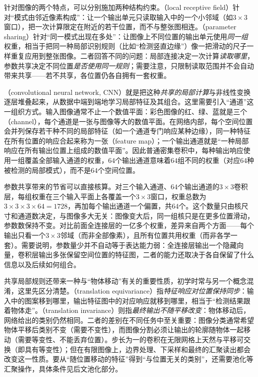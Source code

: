 针对图像的两个特点，可以分别施加两种结构约束。（local receptive field）针对“模式由邻近像素构成”：让一个输出单元只读取输入中的一个小邻域（如$3\times3$窗口），把一次计算限定在附近的若干位置，而不与整张图相连。（parameter sharing）针对“同一模式出现在多处”：让图像上不同位置的输出单元使用\emph{同一组}权重，相当于把同一种局部识别规则（比如“检测竖直边缘”）像一把滑动的尺子一样重复应用到整张图像。二者回答不同的问题：局部连接决定一次计算\emph{读取哪里}，参数共享决定不同位置\emph{是否使用同一规则}；需要注意，只限制读取范围并不会自动带来共享——若不共享，各位置仍各自拥有一套权重。

（convolutional neural network, CNN）就是把这种\emph{共享的局部计算}与非线性变换逐层堆叠起来，从数据中端到端地学习局部特征及其组合。这里需要引入“通道”这一组织方式。输入图像通常不止一个数值平面：彩色图像的红、绿、蓝就是三个（channel），每个通道是一张与图像等大的数值平面。在网络内部，每个空间位置会并列保存若干种不同的局部特征（如一个通道专门响应某种边缘），同一种特征在所有位置的响应合起来称为一张（feature map）；一个输出通道就是“一种局部响应在所有输出位置上组成的数值平面”。因此普通密集卷积中，每种输出响应使用一组覆盖全部输入通道的权重，$64$个输出通道意味着$64$组不同的权重（对应$64$种被检测的局部模式），而不是$64$个空间位置。

参数共享带来的节省可以直接核算。对三个输入通道、$64$个输出通道的$3\times3$卷积层，每组权重在三个输入平面上各覆盖一个$3\times3$窗口，权重总数为$3\times3\times3\times64=1728$，再加每个输出通道一个偏置，共$64$个。这个数量只由核尺寸和通道数决定，与图像多大无关：图像变大后，同一组核只是在更多位置滑动，参数数保持不变。对比前面全连接层的一亿多个权重，差异来自两个方面——每个输出只看一个$3\times3$邻域（而非全部像素），且所有位置共用权重（而非各学一套）。需要说明，参数量少并不自动等于表达能力弱：全连接层输出一个隐藏向量，卷积层输出多张保留空间位置的特征图，二者的能力还取决于各自保留了什么信息以及后续如何组合。

共享局部规则还带来一种与“物体移动”有关的重要性质，初学时常与另一个概念混淆，这里先区分清楚。（translation equivariance）指\emph{特征响应对位置保持同步}：输入中的图案移到哪里，输出特征图中的对应响应就移到哪里，相当于“检测结果跟着物体走”。（translation invariance）则指\emph{最终输出不随平移改变}：物体移动后，网络给出的类别仍然相同。二者的差别在不同任务中至关重要：图像分类通常希望物体平移后类别不变（需要不变性），而图像分割必须让输出的轮廓随物体一起移动（需要等变性、不能丢弃位置）。步长为一的卷积在无限网格上天然与平移可交换（即具有等变性）；但在有限图像上，边界处理、下采样和最终的汇聚读出都会改变这一性质。要从“随位置移动的特征”得到“与位置无关的类别”，还需要池化等汇聚操作，具体条件见后文池化部分。

